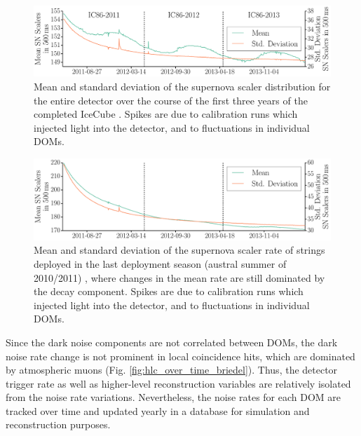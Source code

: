\begin{figure}[!h]
 \centering
 \includegraphics[width=1.0\textwidth]{graphics/dom/performance/darknoise/SN_Scalers_Whole_Detector_Mean_Variance_IC86_2011_2012_2013_smaller_height.pdf}
 \caption{Mean and standard deviation of the supernova scaler distribution for the
   entire detector over the course of the first three years of the
   completed IceCube \cite{briedel_phd}. Spikes are due to calibration
 runs which injected light into the detector, and to fluctuations in
 individual DOMs.} 
 \label{fig:noise_over_time_briedel}
\end{figure}

\begin{figure}[!h]
 \centering
 \includegraphics[width=1.0\textwidth]{graphics/dom/performance/darknoise/SN_Scalers_IC86_mean_variance_Histo_IC86_2011_2012_2013_geomapping.pdf}
 \caption{Mean and standard deviation of the supernova scaler rate of strings
   deployed in the last deployment season (austral summer of 2010/2011)
   \cite{briedel_phd}, where changes in the mean rate are
still dominated by the decay component. Spikes are due to calibration
 runs which injected light into the detector, and to fluctuations in
 individual DOMs.} 
 \label{fig:noise_over_time_briedel_lastseasondepoyed}
\end{figure}

Since the dark noise components are not correlated between
DOMs, the dark noise rate change is not prominent in local coincidence
hits, which are dominated by atmospheric muons (Fig.
\ref{fig:hlc_over_time_briedel}).  Thus, the detector trigger rate as well
as higher-level reconstruction variables are relatively isolated from the
noise rate variations.  Nevertheless, the noise rates for each DOM are
tracked over time and updated yearly in a database for simulation and
reconstruction purposes. 

